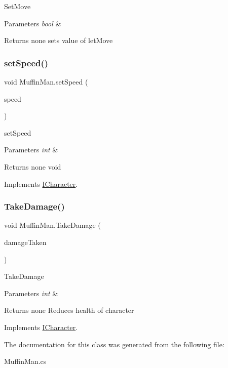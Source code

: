 Set\+Move 
\begin{DoxyParams}{Parameters}
{\em bool} & \\
\hline
\end{DoxyParams}
\begin{DoxyReturn}{Returns}
none sets value of let\+Move 
\end{DoxyReturn}
\mbox{\label{class_muffin_man_ad8d6f582c58fed8b43fd4a7c66ce2411}} 
\subsubsection{\texorpdfstring{set\+Speed()}{setSpeed()}}
{\footnotesize\ttfamily void Muffin\+Man.\+set\+Speed (\begin{DoxyParamCaption}\item[{int}]{speed }\end{DoxyParamCaption})\hspace{0.3cm}{\ttfamily [inline]}}

set\+Speed 
\begin{DoxyParams}{Parameters}
{\em int} & \\
\hline
\end{DoxyParams}
\begin{DoxyReturn}{Returns}
none void 
\end{DoxyReturn}


Implements \mbox{\hyperlink{interface_i_character}{I\+Character}}.

\mbox{\label{class_muffin_man_a0285a9daaa9c7285ad76570a2166733d}} 
\subsubsection{\texorpdfstring{Take\+Damage()}{TakeDamage()}}
{\footnotesize\ttfamily void Muffin\+Man.\+Take\+Damage (\begin{DoxyParamCaption}\item[{int}]{damage\+Taken }\end{DoxyParamCaption})\hspace{0.3cm}{\ttfamily [inline]}}

Take\+Damage 
\begin{DoxyParams}{Parameters}
{\em int} & \\
\hline
\end{DoxyParams}
\begin{DoxyReturn}{Returns}
none Reduces health of character 
\end{DoxyReturn}


Implements \mbox{\hyperlink{interface_i_character}{I\+Character}}.



The documentation for this class was generated from the following file\+:\begin{DoxyCompactItemize}
\item 
Muffin\+Man.\+cs\end{DoxyCompactItemize}
